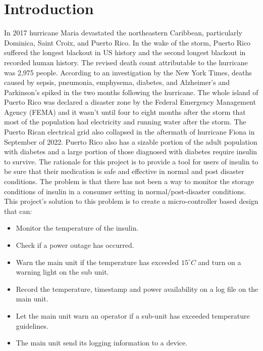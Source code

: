 \section{Introduction}
In 2017 hurricane Maria devastated the northeastern Caribbean, particularly Dominica, Saint Croix, and Puerto Rico. In the wake of the storm, Puerto Rico suffered the longest blackout in US history and the second longest blackout in recorded human history\cite{WorldSecondLargest}. The revised death count attributable to the hurricane was 2,975 people\cite{HurricaneMariaCaused2018}. According to an investigation by the New York Times, deaths caused by  sepsis, pneumonia, emphysema, diabetes, and Alzheimer's and Parkinson's spiked in the two months following the hurricane\cite{roblesOfficialTollPuerto2017}. The whole island of Puerto Rico was declared a disaster zone by the Federal Emergency Management Agency (FEMA) and it wasn't until four to eight months after the storm that most of the population had electricity and running water after the storm. The Puerto Rican electrical grid also collapsed in the aftermath of hurricane Fiona in September of 2022. Puerto Rico also has a sizable portion of the adult population with diabetes and a large portion of those diagnosed with diabetes require insulin to survive\cite{DiabetesPrevalencePopulation}. The rationale for this project is to provide a tool for users of insulin to be sure that their medication is safe and effective in normal and post disaster conditions. The problem is that there has not been a way to monitor the storage conditions of insulin in a consumer setting in normal/post-disaster conditions. This project's solution to this problem is to create a micro-controller based design that can:
\begin{itemize}
  \item Monitor the temperature of the insulin.
  \item Check if a power outage has occurred.
  \item Warn the main unit if the temperature has exceeded \textnormal{$15^{\circ}C$} and turn on a warning light on the sub unit.
  \item Record the temperature, timestamp and power availability on a log file on the main unit.
  \item Let the main unit warn an operator if a sub-unit has exceeded temperature guidelines.
  \item The main unit send its logging information to a device.
\end{itemize}
